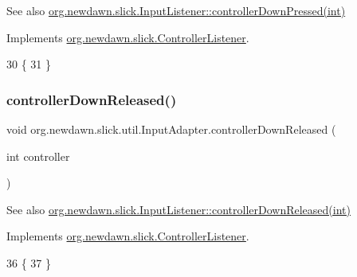 \begin{DoxySeeAlso}{See also}
\mbox{\hyperlink{interfaceorg_1_1newdawn_1_1slick_1_1_controller_listener_a9c619e7cb29b3c8b68bc24f9a4e238d7}{org.\+newdawn.\+slick.\+Input\+Listener\+::controller\+Down\+Pressed(int)}} 
\end{DoxySeeAlso}


Implements \mbox{\hyperlink{interfaceorg_1_1newdawn_1_1slick_1_1_controller_listener_a9c619e7cb29b3c8b68bc24f9a4e238d7}{org.\+newdawn.\+slick.\+Controller\+Listener}}.


\begin{DoxyCode}
30                                                       \{
31     \}
\end{DoxyCode}
\mbox{\label{classorg_1_1newdawn_1_1slick_1_1util_1_1_input_adapter_a6cb307438dc81cba0ec7a9f6b4dbc887}} 
\subsubsection{\texorpdfstring{controller\+Down\+Released()}{controllerDownReleased()}}
{\footnotesize\ttfamily void org.\+newdawn.\+slick.\+util.\+Input\+Adapter.\+controller\+Down\+Released (\begin{DoxyParamCaption}\item[{int}]{controller }\end{DoxyParamCaption})\hspace{0.3cm}{\ttfamily [inline]}}

\begin{DoxySeeAlso}{See also}
\mbox{\hyperlink{interfaceorg_1_1newdawn_1_1slick_1_1_controller_listener_a7d0ca99c8cd5b0d332bece1d17befee7}{org.\+newdawn.\+slick.\+Input\+Listener\+::controller\+Down\+Released(int)}} 
\end{DoxySeeAlso}


Implements \mbox{\hyperlink{interfaceorg_1_1newdawn_1_1slick_1_1_controller_listener_a7d0ca99c8cd5b0d332bece1d17befee7}{org.\+newdawn.\+slick.\+Controller\+Listener}}.


\begin{DoxyCode}
36                                                        \{
37     \}
\end{DoxyCode}
\mbox{\label{classorg_1_1newdawn_1_1slick_1_1util_1_1_input_adapter_ad588e2783005ae0ff252efbc282688cb}} 
